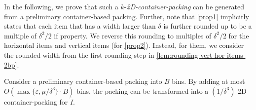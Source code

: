 \documentclass[a4paper,UKenglish,cleveref, autoref, thm-restate]{lipics-v2021}
\newcommand{\eps}{\varepsilon}
\begin{document}
In the following, we prove that such a $k$-\emph{2D-container-packing} can be generated from a preliminary container-based packing. 
Further, note that \cref{prop1} implicitly states that each item that has a width larger than $\delta$ is further rounded up to be a multiple of $\delta^2/2$ if property. 
We reverse this rounding to multiples of $\delta^2/2$ for the horizontal items and vertical items (for \cref{prop2}). 
Instead, for them, we consider the rounded width from the first rounding step in \cref{lem:rounding-vert-hor-items-2bp}.


\begin{lemma}
Consider a preliminary container-based packing into $B$ bins.
By adding at most ${O}(\max\{\eps,\mu/\delta^3\}\cdot B)$ bins, the packing can be transformed into a $(1/\delta^3)$-2D-container-packing for $\tilde{I}$.
\end{lemma}
\end{document}
